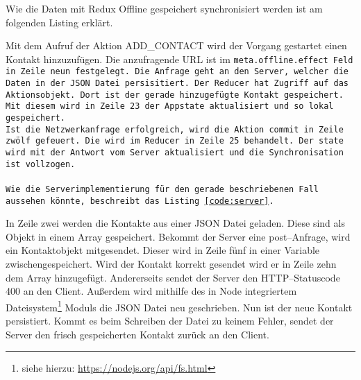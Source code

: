 Wie die Daten mit Redux Offline gespeichert synchronisiert werden ist am folgenden Listing erklärt.
\begin{center}  
\end{center}
%
Mit dem Aufruf der Aktion ADD\_CONTACT wird der Vorgang gestartet einen Kontakt hinzuzufügen. Die anzufragende URL ist im \tt{meta.offline.effect} Feld in Zeile neun festgelegt. Die Anfrage geht an den Server, welcher die Daten in der \gls{JSON} Datei persisitiert.
Der Reducer hat Zugriff auf das Aktionsobjekt. Dort ist der gerade hinzugefügte Kontakt gespeichert. Mit diesem wird in Zeile 23 der Appstate aktualisiert und so lokal gespeichert.\\
Ist die Netzwerkanfrage erfolgreich, wird die Aktion \tt{commit} in Zeile zwölf gefeuert. Die wird im Reducer in Zeile 25 behandelt. Der \tt{state} wird mit der Antwort vom Server aktualisiert und die Synchronisation ist vollzogen.\\\\
Wie die Serverimplementierung für den gerade beschriebenen Fall aussehen könnte, beschreibt das Listing \ref{code:server}.
%
\begin{center}  
\end{center}
%
In Zeile zwei werden die Kontakte aus einer \gls{JSON} Datei geladen. Diese sind als Objekt in einem Array gespeichert. Bekommt der Server eine post--Anfrage, wird ein Kontaktobjekt mitgesendet. Dieser wird in Zeile fünf in einer Variable zwischengespeichert. 
Wird der Kontakt korrekt gesendet wird er in Zeile zehn dem Array hinzugefügt. Andererseits sendet der Server den \gls{HTTP}--Statuscode 400 an den Client. %
Außerdem wird mithilfe des in Node integriertem Dateisystem\footnote{siehe hierzu: \url{https://nodejs.org/api/fs.html}} Moduls die \gls{JSON} Datei neu geschrieben. Nun ist der neue Kontakt persistiert. Kommt es beim Schreiben der Datei zu keinem Fehler, sendet der Server den frisch gespeicherten Kontakt zurück an den Client.